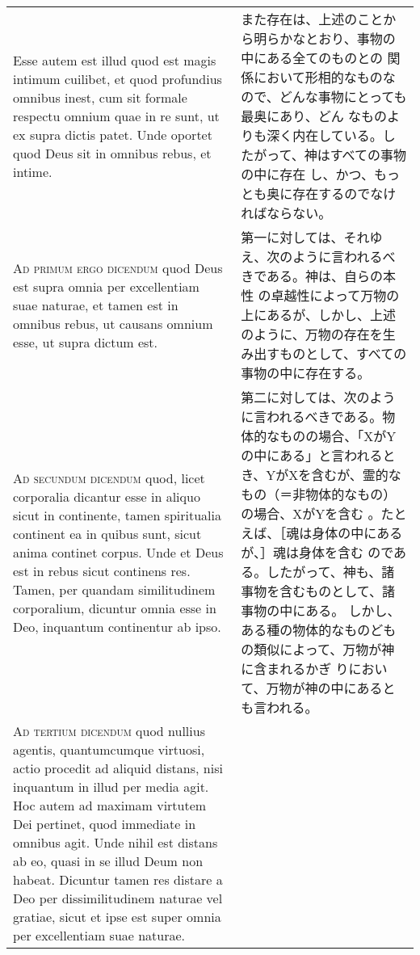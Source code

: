 \documentclass[10pt]{jsarticle} %
\begin{document}
\begin{longtable}{p{21em}p{21em}}
\\

Esse autem est illud quod est magis intimum cuilibet, et quod
 profundius omnibus inest, cum sit formale respectu omnium quae in re
 sunt, ut ex supra dictis patet. Unde oportet quod Deus sit in omnibus
 rebus, et intime.

&


また存在は、上述のことから明らかなとおり、事物の中にある全てのものとの
 関係において形相的なものなので、どんな事物にとっても最奥にあり、どん
 なものよりも深く内在している。したがって、神はすべての事物の中に存在
 し、かつ、もっとも奥に存在するのでなければならない。

\\

{\scshape Ad primum ergo dicendum} quod Deus est supra omnia per excellentiam
 suae naturae, et tamen est in omnibus rebus, ut causans omnium esse, ut
 supra dictum est.

&

第一に対しては、それゆえ、次のように言われるべきである。神は、自らの本性
 の卓越性によって万物の上にあるが、しかし、上述のように、万物の存在を生
 み出すものとして、すべての事物の中に存在する。

\\

{\scshape Ad secundum dicendum} quod, licet corporalia dicantur esse in aliquo
 sicut in continente, tamen spiritualia continent ea in quibus sunt,
 sicut anima continet corpus. Unde et Deus est in rebus sicut continens
 res. Tamen, per quandam similitudinem corporalium, dicuntur omnia esse
 in Deo, inquantum continentur ab ipso.

&

第二に対しては、次のように言われるべきである。物体的なものの場合、「XがY
 の中にある」と言われるとき、YがXを含むが、霊的なもの（＝非物体的なもの）
 の場合、XがYを含む 。たとえば、［魂は身体の中にあるが、］魂は身体を含む
 のである。したがって、神も、諸事物を含むものとして、諸事物の中にある。
 しかし、ある種の物体的なものどもの類似によって、万物が神に含まれるかぎ
 りにおいて、万物が神の中にあるとも言われる。

\\


{\scshape Ad tertium dicendum} quod nullius agentis, quantumcumque virtuosi,
 actio procedit ad aliquid distans, nisi inquantum in illud per media
 agit. Hoc autem ad maximam virtutem Dei pertinet, quod immediate in
 omnibus agit. Unde nihil est distans ab eo, quasi in se illud Deum non
 habeat. Dicuntur tamen res distare a Deo per dissimilitudinem naturae
 vel gratiae, sicut et ipse est super omnia per excellentiam suae
 naturae.


\end{longtable}
\end{document}
